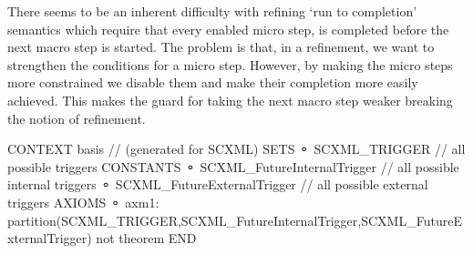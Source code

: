 There seems to be an inherent difficulty with refining `run to completion' semantics which require that every enabled micro step, is completed before the next macro step is started. The problem is that, in a refinement, we want to strengthen the conditions for a micro step. However, by making the micro steps more constrained we disable them and make their completion more easily achieved. This makes the guard for taking the next macro step weaker breaking the notion of refinement.


\begin{EventBcode}
	CONTEXT
		basis 	// (generated for SCXML)
	SETS
	⚬	SCXML_TRIGGER	 // all possible triggers
	CONSTANTS
	⚬	SCXML_FutureInternalTrigger	 // all possible internal triggers
	⚬	SCXML_FutureExternalTrigger	 // all possible external triggers
	AXIOMS
	⚬	axm1:	partition(SCXML_TRIGGER,SCXML_FutureInternalTrigger,SCXML_FutureExternalTrigger) not theorem 
	END
\end{EventBcode}

